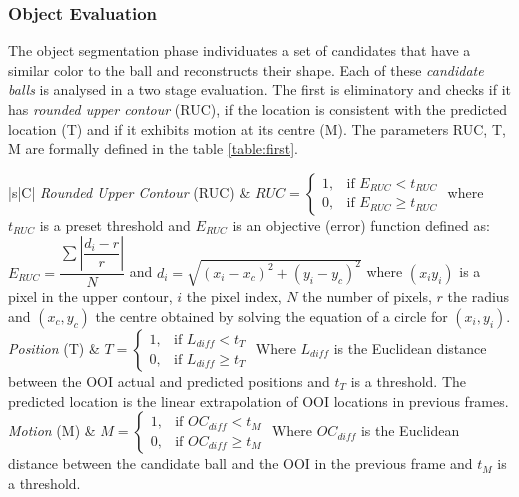 \documentclass[a4paper]{article}
\begin{document}
\subsubsection{Object Evaluation}
The object segmentation phase individuates a set of candidates that have a similar color to the ball and reconstructs their shape. Each of these \textit{candidate balls} is analysed in a two stage evaluation. The first is eliminatory and checks if it has \textit{rounded upper contour} (RUC), if the location is consistent with the predicted location (T) and if it exhibits motion at its centre (M). The parameters RUC, T, M are formally defined in the table \ref{table:first}.

\begin{table}[!ht]
\begin{tabularx}{\textwidth}{|s|C|}
\hline
	\textit{Rounded Upper Contour} (RUC) & 
	$ RUC= \begin{cases}
      1, &\text{if } E_{RUC} < t_{RUC} \\
      0, & \text{if } E_{RUC} \geq t_{RUC}
    \end{cases} $ 
    where $t_{RUC}$ is a preset threshold and $E_{RUC}$ is an objective (error) function defined as: 
$ E_{RUC} = \dfrac{\sum{|\dfrac{d_{i}-r}{r}|}}{N} $ and $d_{i} = \sqrt{(x_{i} - x_{c})^2 + (y_{i} - y_{c})^2} $ where $(x_{i}y_{i})$ is a pixel in the upper contour, $i$ the pixel index, $N$ the number of pixels, $r$ the radius and $(x_{c},y_{c})$ the centre obtained by solving the equation of a circle for $(x_{i},y_{i})$.  \\ \hline
	\textit{Position} (T) & 
	$ T= \begin{cases}
      1, &\text{if } L_{diff} < t_{T} \\
      0, & \text{if } L_{diff} \geq t_{T}
    \end{cases} $ 
    Where $L_{diff}$ is the Euclidean distance between the OOI actual and predicted positions and  $t_{T}$ is a threshold. The predicted location is the linear extrapolation of OOI locations in previous frames. \\ \hline
    \textit{Motion} (M) & 
	$ M= \begin{cases}
      1, &\text{if } OC_{diff} < t_{M} \\
      0, & \text{if } OC_{diff} \geq t_{M}
    \end{cases} $ 
    Where $OC_{diff}$ is the Euclidean distance between the candidate ball and the OOI in the previous frame and  $t_{M}$ is a threshold. \\ \hline
\end{tabularx}
\caption{First Stage Evaluation}
\label{table:first}
\end{table}
\end{document}
